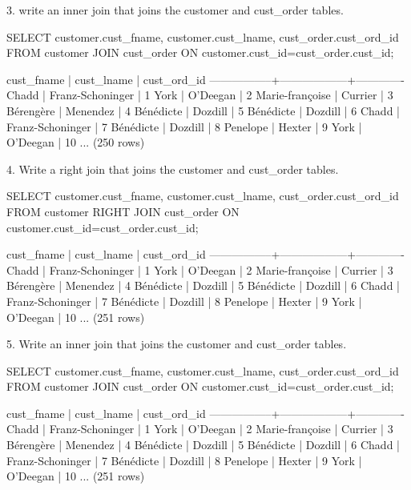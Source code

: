 3. write an inner join that joins the customer and cust\_order tables. 
\begin{sql}
SELECT customer.cust_fname, customer.cust_lname, cust_order.cust_ord_id FROM customer
JOIN cust_order ON customer.cust_id=cust_order.cust_id;
\end{sql}
\begin{pseudo*}
   cust_fname    |    cust_lname    | cust_ord_id
-----------------+------------------+-------------
 Chadd           | Franz-Schoninger |           1
 York            | O'Deegan         |           2
 Marie-françoise | Currier          |           3
 Bérengère       | Menendez         |           4
 Bénédicte       | Dozdill          |           5
 Bénédicte       | Dozdill          |           6
 Chadd           | Franz-Schoninger |           7
 Bénédicte       | Dozdill          |           8
 Penelope        | Hexter           |           9
 York            | O'Deegan         |          10
 ...
(250 rows)
\end{pseudo*}

4. Write a right join that joins the customer and cust\_order tables. 
\begin{sql}
SELECT customer.cust_fname, customer.cust_lname, cust_order.cust_ord_id FROM customer
RIGHT JOIN cust_order ON customer.cust_id=cust_order.cust_id;
\end{sql}
\begin{pseudo*}
   cust_fname    |    cust_lname    | cust_ord_id
-----------------+------------------+-------------
 Chadd           | Franz-Schoninger |           1
 York            | O'Deegan         |           2
 Marie-françoise | Currier          |           3
 Bérengère       | Menendez         |           4
 Bénédicte       | Dozdill          |           5
 Bénédicte       | Dozdill          |           6
 Chadd           | Franz-Schoninger |           7
 Bénédicte       | Dozdill          |           8
 Penelope        | Hexter           |           9
 York            | O'Deegan         |          10
 ...
(251 rows)
\end{pseudo*}

5. Write an inner join that joins the customer and cust\_order tables. 
\begin{sql}
SELECT customer.cust_fname, customer.cust_lname, cust_order.cust_ord_id FROM customer
JOIN cust_order ON customer.cust_id=cust_order.cust_id;
\end{sql}
\begin{pseudo*}
   cust_fname    |    cust_lname    | cust_ord_id
-----------------+------------------+-------------
 Chadd           | Franz-Schoninger |           1
 York            | O'Deegan         |           2
 Marie-françoise | Currier          |           3
 Bérengère       | Menendez         |           4
 Bénédicte       | Dozdill          |           5
 Bénédicte       | Dozdill          |           6
 Chadd           | Franz-Schoninger |           7
 Bénédicte       | Dozdill          |           8
 Penelope        | Hexter           |           9
 York            | O'Deegan         |          10
 ...
(251 rows)
\end{pseudo*}


